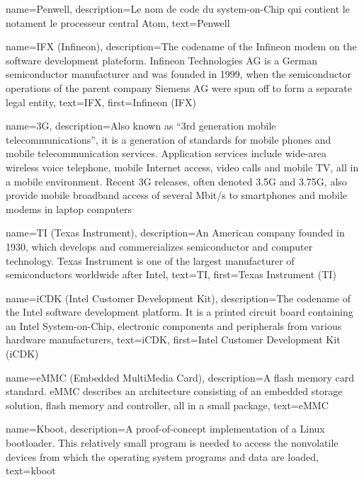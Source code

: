 {
  name=Penwell,
  description={Le nom de code du system-on-Chip qui contient le notament le processeur
   central Atom},
  text=Penwell
}

{
  name=IFX (Infineon),
  description={The codename of the Infineon modem on the software
    development plateform. Infineon Technologies AG is a German
    semiconductor manufacturer and was founded in 1999, when the
    semiconductor operations of the parent company Siemens AG were
    spun off to form a separate legal entity},
  text=IFX,
  first=Infineon (IFX)
}

{
  name=3G,
  description={Also known as ``3rd generation mobile
    telecommunications'', it is a generation of standards for mobile
    phones and mobile telecommunication services. Application services
    include wide-area wireless voice telephone, mobile Internet
    access, video calls and mobile TV, all in a mobile
    environment. Recent 3G releases, often denoted 3.5G and 3.75G,
    also provide mobile broadband access of several Mbit/s to
    smartphones and mobile modems in laptop computers}
}

{
  name=TI (Texas Instrument),
  description={An American company founded in 1930, which develops and
    commercializes semiconductor and computer technology. Texas
    Instrument is one of the largest manufacturer of semiconductors
    worldwide after Intel},
  text=TI,
  first=Texas Instrument (TI)
}

{
  name=iCDK (Intel Customer Development Kit),
  description={The codename of the Intel software development
    platform. It is a printed circuit board containing an Intel
    System-on-Chip, electronic components and peripherals from various
    hardware manufacturers},
  text=iCDK,
  first=Intel Customer Development Kit (iCDK)
}

{
  name=eMMC (Embedded MultiMedia Card),
  description={A flash memory card standard. eMMC describes an
    architecture consisting of an embedded storage solution, flash
    memory and controller, all in a small package},
  text=eMMC
}

{
  name=Kboot,
  description={A proof-of-concept implementation of a Linux
    bootloader. This relatively small program is needed to access the
    nonvolatile devices from which the operating system programs and
    data are loaded},
  text=kboot
}

